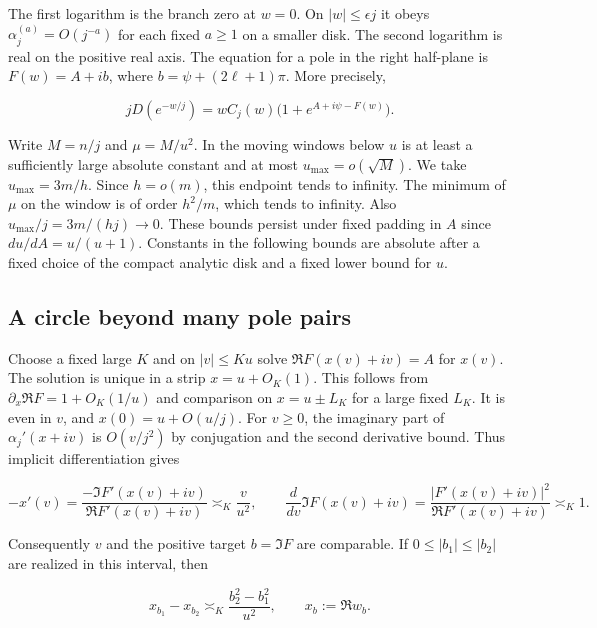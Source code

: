 \documentclass[11pt]{article}
\begin{document}
The first logarithm is the branch zero at \(w=0\). On \(|w|\le\epsilon j\) it obeys \(\alpha_j^{(a)}=O(j^{-a})\) for each fixed \(a\ge1\) on a smaller disk. The second logarithm is real on the positive real axis. The equation for a pole in the right half-plane is \(F(w)=A+ib\), where \(b=\psi+(2\ell+1)\pi\). More precisely,

\begin{equation*}
jD(e^{-w/j})=wC_j(w)\bigl(1+e^{A+i\psi-F(w)}\bigr).
\end{equation*}

Write \(M=n/j\) and \(\mu=M/u^2\). In the moving windows below \(u\) is at least a sufficiently large absolute constant and at most \(u_{\max}=o(\sqrt M)\). We take \(u_{\max}=3m/h\). Since \(h=o(m)\), this endpoint tends to infinity. The minimum of \(\mu\) on the window is of order \(h^2/m\), which tends to infinity. Also \(u_{\max}/j=3m/(hj)\to0\). These bounds persist under fixed padding in \(A\) since \(du/dA=u/(u+1)\). Constants in the following bounds are absolute after a fixed choice of the compact analytic disk and a fixed lower bound for \(u\).

\subsection{A circle beyond many pole pairs}
\label{sec:a-circle-beyond-many-pole-pairs}

Choose a fixed large \(K\) and on \(|v|\le Ku\) solve \(\Re F(x(v)+iv)=A\) for \(x(v)\). The solution is unique in a strip \(x=u+O_K(1)\). This follows from \(\partial_x\Re F=1+O_K(1/u)\) and comparison on \(x=u\pm L_K\) for a large fixed \(L_K\). It is even in \(v\), and \(x(0)=u+O(u/j)\). For \(v\ge0\), the imaginary part of \(\alpha_j'(x+iv)\) is \(O(v/j^2)\) by conjugation and the second derivative bound. Thus implicit differentiation gives

\begin{equation*}
-x'(v)=\frac{-\Im F'(x(v)+iv)}{\Re F'(x(v)+iv)}\asymp_K \frac{v}{u^2},\qquad
\frac{d}{dv}\Im F(x(v)+iv)=\frac{|F'(x(v)+iv)|^2}{\Re F'(x(v)+iv)}\asymp_K1.
\end{equation*}

Consequently \(v\) and the positive target \(b=\Im F\) are comparable. If \(0\le |b_1|\le |b_2|\) are realized in this interval, then

\begin{equation*}
x_{b_1}-x_{b_2}\asymp_K\frac{b_2^2-b_1^2}{u^2},
\qquad x_b:=\Re w_b.
\end{equation*}
\end{document}
